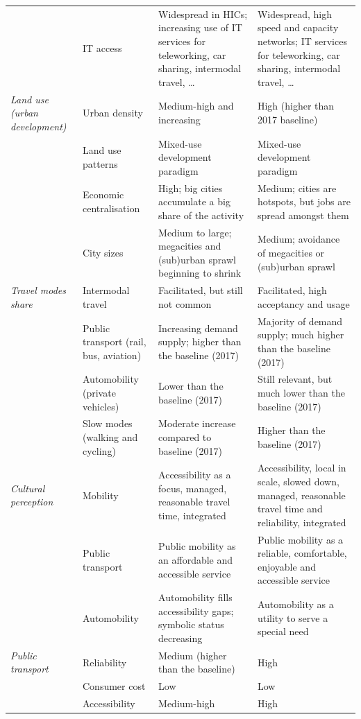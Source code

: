 \begin{landscape}
{\begin{longtable}{p{2.5cm}p{3.5cm}p{6cm}p{6cm}}
 & IT access & Widespread in HICs; increasing use of IT services for teleworking, car sharing, intermodal travel, \ldots & Widespread, high speed and capacity networks; IT services for teleworking, car sharing, intermodal travel, \ldots \\\addlinespace
\textit{Land use (urban development)} & Urban density & Medium-high and increasing & High (higher than 2017 baseline) \\*
 & Land use patterns & Mixed-use development paradigm & Mixed-use development paradigm \\*
 & Economic centralisation & High; big cities accumulate a big share of the activity & Medium; cities are hotspots, but jobs are spread amongst them \\*
 & City sizes & Medium to large; megacities and (sub)urban sprawl beginning to shrink & Medium; avoidance of megacities or (sub)urban sprawl \\ \addlinespace
\textit{Travel modes share} & Intermodal travel & Facilitated, but still not common & Facilitated, high acceptancy and usage \\*
 & Public transport (rail, bus, aviation) & Increasing demand supply; higher than the baseline (2017) & Majority of demand supply; much higher than the baseline (2017) \\*
 & Automobility (private vehicles) & Lower than the baseline (2017) & Still relevant, but much lower than the baseline (2017) \\*
 & Slow modes (walking and cycling) & Moderate increase compared to baseline (2017) & Higher than the baseline (2017) \\ \addlinespace
\textit{Cultural perception} & Mobility & Accessibility as a focus, managed, reasonable travel time, integrated & Accessibility, local in scale, slowed down, managed, reasonable travel time and reliability, integrated \\*
 & Public transport & Public mobility as an affordable and accessible service & Public mobility as a reliable, comfortable, enjoyable and accessible service \\*
 & Automobility & Automobility fills accessibility gaps; symbolic status decreasing & Automobility as a utility to serve a special need \\
\textit{Public transport} & Reliability & Medium (higher than the baseline) & High \\*
 & Consumer cost & Low & Low \\*
 & Accessibility & Medium-high & High \\*

\end{longtable}}
\end{landscape}
